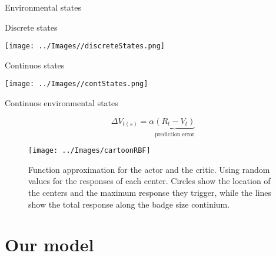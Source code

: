 \documentclass[
  ignorenonframetext,
]{beamer}
\begin{document}
\begin{frame}{Environmental states}
\protect\hypertarget{environmental-states}{}

\begin{block}{Discrete states}

\texttt{[image: ../Images//discreteStates.png]}

\pause

\end{block}

\begin{block}{Continuos states}

\texttt{[image: ../Images//contStates.png]}

\end{block}

\end{frame}

\begin{frame}{Continuos environmental states}
\protect\hypertarget{continuos-environmental-states}{}

\begin{equation*}
  \Delta V_{t(s)}=\alpha \underbrace{(R_t-V_t)}_\text{prediction error}
\end{equation*}

\begin{figure}
\texttt{[image: ../Images/cartoonRBF]} \caption{\label{fig:learning_cartoonRBF}Function approximation for the actor and the critic. Using random values for the responses of each center. Circles show the location of the centers and the maximum response they trigger, while the lines show the total response along the badge size continium.}\label{fig:fig2}
\end{figure}

\end{frame}

\hypertarget{our-model}{%
\section{Our model}\label{our-model}}
\end{document}
